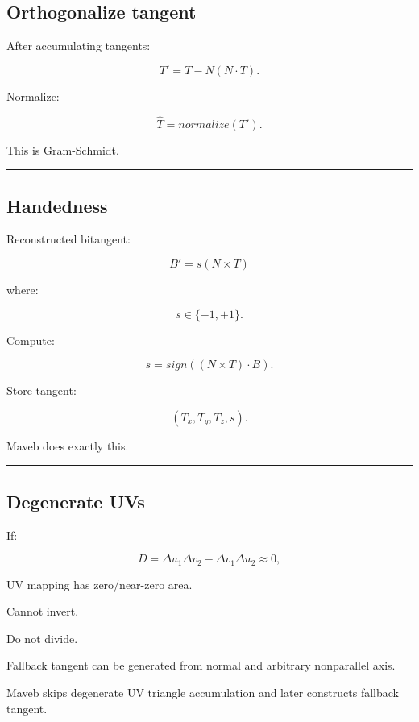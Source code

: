 \subsection{Orthogonalize tangent}\label{04-visual-computing-ii-ch041-orthogonalize-tangent}

After accumulating tangents:

\[
T'
=
T-N(N\cdot T).
\]

Normalize:

\[
\boxed{
\hat T=
normalize(T').
}
\]

This is Gram-Schmidt.

\begin{center}\rule{0.5\linewidth}{0.5pt}\end{center}

\subsection{Handedness}\label{04-visual-computing-ii-ch041-handedness}

Reconstructed bitangent:

\[
B'
=
s(N\times T)
\]

where:

\[
s\in\{-1,+1\}.
\]

Compute:

\[
\boxed{
s=
sign(
(N\times T)\cdot B
).
}
\]

Store tangent:

\[
(T_x,T_y,T_z,s).
\]

Maveb does exactly this.

\begin{center}\rule{0.5\linewidth}{0.5pt}\end{center}

\subsection{Degenerate UVs}\label{04-visual-computing-ii-ch041-degenerate-uvs}

If:

\[
D
=
\Delta u_1\Delta v_2-
\Delta v_1\Delta u_2
\approx0,
\]

UV mapping has zero/near-zero area.

Cannot invert.

Do not divide.

Fallback tangent can be generated from normal and arbitrary nonparallel axis.

Maveb skips degenerate UV triangle accumulation and later constructs fallback tangent.

